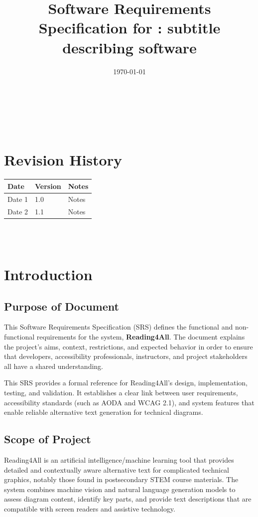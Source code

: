 \documentclass[12pt]{article}
\begin{document}
\title{Software Requirements Specification for \progname: subtitle describing software} 
\author{\authname}
\date{\today}
	
\maketitle

~\newpage


\tableofcontents

~\newpage

\section*{Revision History}

\begin{tabularx}{\textwidth}{p{3cm}p{2cm}X}
\toprule {\textbf{Date}} & {\textbf{Version}} & {\textbf{Notes}}\\
\midrule
Date 1 & 1.0 & Notes\\
Date 2 & 1.1 & Notes\\
\bottomrule
\end{tabularx}

~\\

~\newpage
\section{Introduction}

\subsection{Purpose of Document}
This Software Requirements Specification (SRS) defines the functional and non-functional requirements for the \progname{} system, \textbf{Reading4All}. The document explains the project's aims, context, restrictions, and expected behavior in order to ensure that developers, accessibility professionals, instructors, and project stakeholders all have a shared understanding.

This SRS provides a formal reference for Reading4All's design, implementation, testing, and validation. It establishes a clear link between user requirements, accessibility standards (such as AODA and WCAG 2.1), and system features that enable reliable alternative text generation for technical diagrams.

\subsection{Scope of Project}
Reading4All is an artificial intelligence/machine learning tool that provides detailed and contextually aware alternative text for complicated technical graphics, notably those found in postsecondary STEM course materials. The system combines machine vision and natural language generation models to assess diagram content, identify key parts, and provide text descriptions that are compatible with screen readers and assistive technology.
\end{document}
